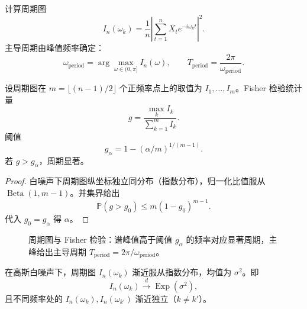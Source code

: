 \begin{definition}[基于周期图的周期确定]\label{def:ts_period_detection}
计算周期图
\[
I_n(\omega_k) = \frac{1}{n}\left|\sum_{t=1}^n X_t e^{-i\omega_k t}\right|^2.
\]
主导周期由峰值频率确定：
\[
\omega_{\text{period}} = \arg\max_{\omega \in (0, \pi]} I_n(\omega), \qquad
T_{\text{period}} = \frac{2\pi}{\omega_{\text{period}}}.
\]
\end{definition}

\begin{proposition}\label{prop:ts_period_significance}
设周期图在 $m = \lfloor (n-1)/2 \rfloor$ 个正频率点上的取值为 $I_1, \dots, I_m$。Fisher 检验统计量
\[
g = \frac{\max_k I_k}{\sum_{k=1}^{m} I_k}.
\]
阈值
\[
g_\alpha = 1 - (\alpha/m)^{1/(m-1)}.
\]
若 $g > g_\alpha$，周期显著。
\end{proposition}

\begin{proof}
白噪声下周期图纵坐标独立同分布（指数分布），归一化比值服从 $\operatorname{Beta}(1, m-1)$。并集界给出
\[
\mathbb{P}(g > g_0) \le m(1-g_0)^{m-1}.
\]
代入 $g_0 = g_\alpha$ 得 $\alpha$。
\end{proof}

\begin{figure}[htbp]
\centering
{}
\caption{周期图与 Fisher 检验：谱峰值高于阈值 $g_\alpha$ 的频率对应显著周期，主峰给出主导周期 $T_{\text{period}}=2\pi/\omega_{\text{period}}$。}
\label{fig:periodogram_fisher}
\end{figure}

\begin{property}[周期图的渐近分布]\label{prop:ts_periodogram_distribution}
在高斯白噪声下，周期图 $I_n(\omega_k)$ 渐近服从指数分布，均值为 $\sigma^2$。即
\[
I_n(\omega_k)\xrightarrow{d}\operatorname{Exp}(\sigma^2),
\]
且不同频率处的 $I_n(\omega_k),I_n(\omega_{k'})$ 渐近独立（$k\neq k'$）。
\end{property}

